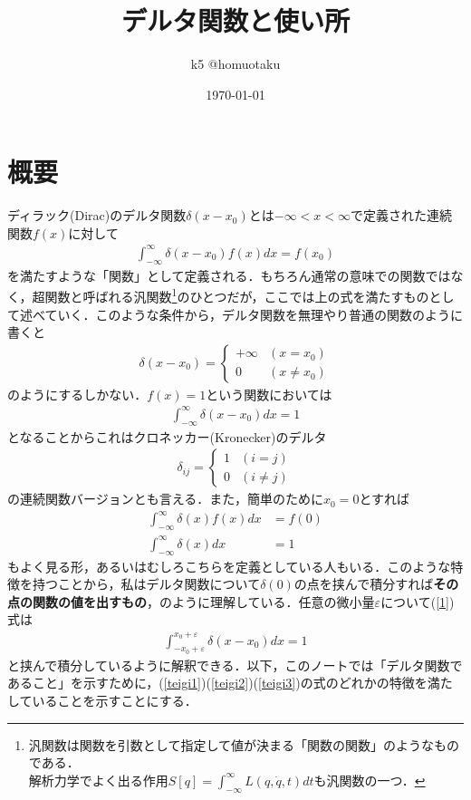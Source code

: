 \documentclass{jsarticle}
\title{デルタ関数と使い所}
\date{\today}
\author{k5 @homuotaku}
\begin{document}
\maketitle
\tableofcontents
\section{概要}
ディラック(Dirac)のデルタ関数$\delta(x-x_{0})$とは$-\infty<x<\infty$で定義された連続関数$f(x)$に対して
\begin{align}
\label{teigi1}\int_{-\infty}^{\infty}\delta(x-x_{0})f(x)dx=f(x_{0})
\end{align}
を満たすような「関数」として定義される．もちろん通常の意味での関数ではなく，超関数と呼ばれる汎関数\footnote{汎関数は関数を引数として指定して値が決まる「関数の関数」のようなものである．\\解析力学でよく出る作用$ \displaystyle S[q]=\int_{-\infty}^{\infty}L(q,\dot{q},t)dt$も汎関数の一つ．}のひとつだが，ここでは上の式を満たすものとして述べていく．このような条件から，デルタ関数を無理やり普通の関数のように書くと
\begin{align}
\delta(x-x_{0})=\begin{cases}
+\infty&(x=x_{0})\\
0&(x\neq x_{0})
\end{cases}
\end{align}
のようにするしかない．$f(x)=1$という関数においては
\begin{align}
\label{1}\int_{-\infty}^{\infty}\delta(x-x_{0})dx=1
\end{align}
となることからこれはクロネッカー(Kronecker)のデルタ
\begin{align}
\delta_{ij}=\begin{cases}
1&(i=j)\\
0&(i\neq j)
\end{cases}
\end{align}
の連続関数バージョンとも言える．また，簡単のために$x_{0}=0$とすれば
\begin{align}
\label{teigi2}\int_{-\infty}^{\infty}\delta(x)f(x)dx&=f(0)\\
\label{teigi3}\int_{-\infty}^{\infty}\delta(x)dx&=1
\end{align}
もよく見る形，あるいはむしろこちらを定義としている人もいる．このような特徴を持つことから，私はデルタ関数について$\delta(0)$の点を挟んで積分すれば{\bf その点の関数の値を出すもの}，のように理解している．任意の微小量$\varepsilon$について(\ref{1})式は
\begin{align}
\int_{-x_{0}+\varepsilon}^{x_{0}+\varepsilon}\delta(x-x_{0})dx=1
\end{align}
と挟んで積分しているように解釈できる．以下，このノートでは「デルタ関数であること」を示すために，(\ref{teigi1})(\ref{teigi2})(\ref{teigi3})の式のどれかの特徴を満たしていることを示すことにする．
\end{document}

